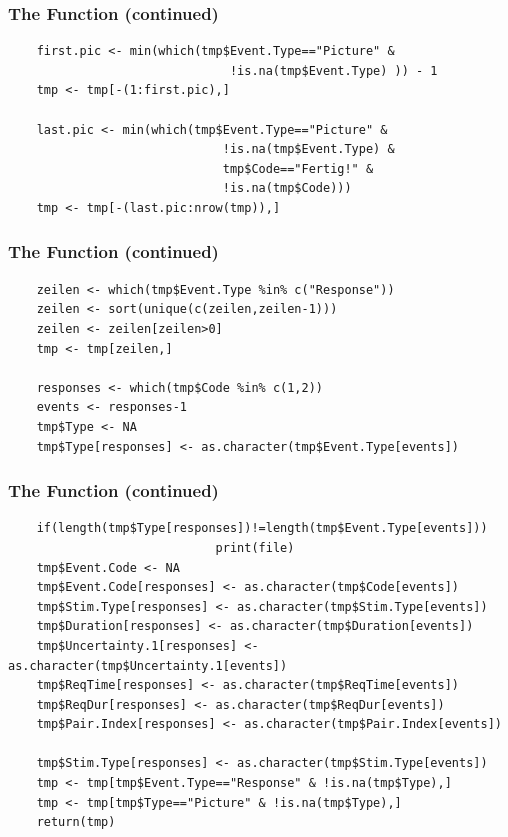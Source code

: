 \documentclass[xcolor={table},c]{beamer}
\begin{document}
\begin{frame}[fragile]\frametitle{The Function (continued)}\scriptsize
\begin{verbatim}
    first.pic <- min(which(tmp$Event.Type=="Picture" & 
                               !is.na(tmp$Event.Type) )) - 1
    tmp <- tmp[-(1:first.pic),]

    last.pic <- min(which(tmp$Event.Type=="Picture" & 
                              !is.na(tmp$Event.Type) &
                              tmp$Code=="Fertig!" & 
                              !is.na(tmp$Code)))
    tmp <- tmp[-(last.pic:nrow(tmp)),]

\end{verbatim}
\end{frame}


\begin{frame}[fragile]\frametitle{The Function (continued)}\scriptsize
\begin{verbatim}
    zeilen <- which(tmp$Event.Type %in% c("Response"))
    zeilen <- sort(unique(c(zeilen,zeilen-1)))
    zeilen <- zeilen[zeilen>0]
    tmp <- tmp[zeilen,]
    
    responses <- which(tmp$Code %in% c(1,2))
    events <- responses-1
    tmp$Type <- NA
    tmp$Type[responses] <- as.character(tmp$Event.Type[events])
\end{verbatim}
\end{frame}


\begin{frame}[fragile]\frametitle{The Function (continued)}\scriptsize
\begin{verbatim}
    if(length(tmp$Type[responses])!=length(tmp$Event.Type[events])) 
                             print(file) 
    tmp$Event.Code <- NA
    tmp$Event.Code[responses] <- as.character(tmp$Code[events])
    tmp$Stim.Type[responses] <- as.character(tmp$Stim.Type[events])
    tmp$Duration[responses] <- as.character(tmp$Duration[events])
    tmp$Uncertainty.1[responses] <- as.character(tmp$Uncertainty.1[events])
    tmp$ReqTime[responses] <- as.character(tmp$ReqTime[events])
    tmp$ReqDur[responses] <- as.character(tmp$ReqDur[events])
    tmp$Pair.Index[responses] <- as.character(tmp$Pair.Index[events])

    tmp$Stim.Type[responses] <- as.character(tmp$Stim.Type[events])
    tmp <- tmp[tmp$Event.Type=="Response" & !is.na(tmp$Type),]
    tmp <- tmp[tmp$Type=="Picture" & !is.na(tmp$Type),]
    return(tmp)
\end{verbatim}
\end{frame}
\end{document}
